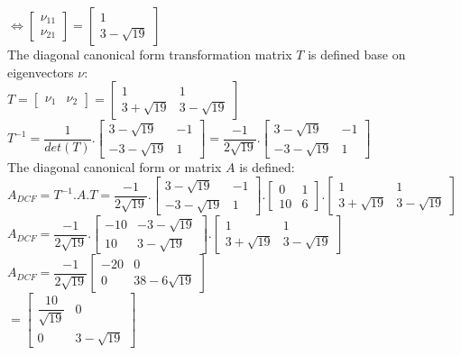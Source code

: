 \documentclass[14pt,a4paper]{article}
\begin{document}
\begin{enumerate}
		$ \Leftrightarrow \begin{bmatrix} \nu_{11} \\\nu_{21}	\end{bmatrix} = \begin{bmatrix} 1 \\ 3-\sqrt{19}	\end{bmatrix}$ \\
	
		The diagonal canonical form transformation matrix $T$ is defined base on eigenvectors $\nu$: \\
		$T = \begin{bmatrix} \nu_1 & \nu_2	\end{bmatrix} = \begin{bmatrix} 1 & 1 \\ 3+\sqrt{19} & 3 - \sqrt{19} \end{bmatrix} $\\
		$T^{-1} = \dfrac{1}{det(T)}.\begin{bmatrix} 3-\sqrt{19} & -1 \\ -3-\sqrt{19} & 1  \end{bmatrix} = \dfrac{-1}{2\sqrt{19}}.\begin{bmatrix} 3-\sqrt{19} & -1 \\ -3-\sqrt{19} & 1 \end{bmatrix} $\\
		
		The diagonal canonical form or matrix $A$ is defined: \\
		$A_{DCF} = T^{-1}.A.T = \dfrac{-1}{2\sqrt{19}} .\begin{bmatrix} 3-\sqrt{19} & -1 \\ -3-\sqrt{19} & 1 \end{bmatrix} .\begin{bmatrix} 0&1 \\ 10&6 \end{bmatrix} .\begin{bmatrix} 1 & 1 \\ 3+\sqrt{19} & 3 - \sqrt{19} \end{bmatrix}  $\\
		
		$A_{DCF} = \dfrac{-1}{2\sqrt{19}} .\begin{bmatrix} -10 & -3-\sqrt{19} \\ 10 & 3-\sqrt{19} \end{bmatrix} .\begin{bmatrix} 1 & 1 \\ 3+\sqrt{19} & 3 - \sqrt{19} \end{bmatrix} $ \\
		$A_{DCF} = \dfrac{-1}{2\sqrt{19}} \begin{bmatrix} -20 & 0 \\ 0 & 38-6\sqrt{19} \end{bmatrix}$\\
		$ = \begin{bmatrix} \dfrac{10}{\sqrt{19}} & 0 \\ 0 & 3-\sqrt{19} \end{bmatrix} $\\
		

\end{enumerate}
\end{document}
